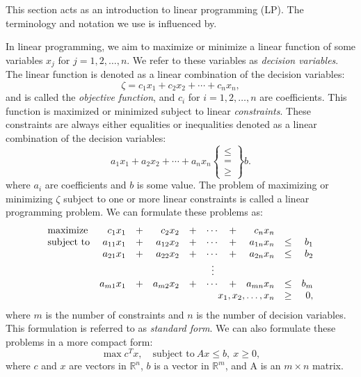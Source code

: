 This section acts as an introduction to linear programming (LP). The terminology and
notation we use is influenced by\cite{vanderbei}.

In linear programming, we aim to maximize or minimize a linear function of
some variables $x_j$ for $j=1,2,\ldots,n$. We refer to these variables as
\textit{decision variables}. The linear function is denoted as a linear
combination of the decision variables:
\[
\zeta = c_1 x_1 + c_2 x_2 + \cdots + c_n x_n,
\]
and is called the \textit{objective function}, and $c_i$ for $i=1,2,\ldots,n$
are coefficients.
This function is maximized
or minimized subject to linear \textit{constraints}. These constraints are
always either equalities or inequalities denoted as a linear combination
of the decision variables:
\[
a_1x_1 + a_2 x_2 + \cdots + a_n x_n \left\{\begin{array}{c} \leq \\ = \\ \geq \end{array}\right\} b.
\]
where $a_i$ are coefficients and $b$ is some value.
The problem of maximizing or minimizing $\zeta$ subject to one or more
linear constraints is called a linear programming problem.
We can formulate these problems as:
\[
\begin{array}{lrcrcccrcr}
\textrm{maximize}   & c_1 x_1    &+& c_2 x_2    &+& \cdots &+& c_n x_n               \\
\textrm{subject to} & a_{11} x_1 &+& a_{12} x_2 &+& \cdots &+& a_{1n} x_n &\leq& b_1 \\
                    & a_{21} x_1 &+& a_{22} x_2 &+& \cdots &+& a_{2n} x_n &\leq& b_2 \\
                    &            & &            & & \vdots & &            &    &     \\
                    & a_{m1} x_1 &+& a_{m2} x_2 &+& \cdots &+& a_{mn} x_n &\leq& b_m \\
                    \multicolumn{8}{r}{x_1,x_2,\ldots,x_n} &\geq& 0,
\end{array}
\]
where $m$ is the number of constraints and $n$ is the number of decision variables.
This formulation is referred to as \textit{standard form}\cite{vanderbei}.
We can also formulate these problems in a more compact form:
\begin{equation}
\max{c^T x},\quad \textrm{subject to}~Ax \leq b, ~ x \geq 0, \label{eq:primal}
\end{equation}
where $c$ and $x$ are vectors in $\mathbb{R}^n$, $b$ is a vector in $\mathbb{R}^m$, and
A is an $m \times n$ matrix.

